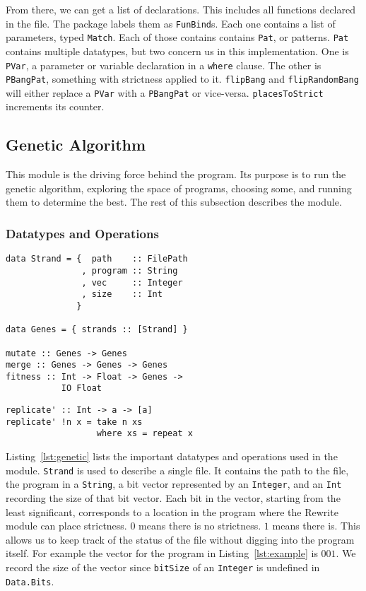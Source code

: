 \documentclass{sigplanconf}
\begin{document}
From there, we can get a list of declarations. This includes all functions declared in the file. The package labels them as \lstinline!FunBind!s. Each one contains a list of parameters, typed \lstinline!Match!. Each of those contains contains \lstinline!Pat!, or patterns. \lstinline!Pat! contains multiple datatypes, but two concern us in this implementation. One is \lstinline!PVar!, a parameter or variable declaration in a \lstinline!where! clause. The other is \lstinline!PBangPat!, something with strictness applied to it. \lstinline!flipBang! and \lstinline!flipRandomBang! will either replace a \lstinline!PVar! with a \lstinline!PBangPat! or vice-versa. \lstinline!placesToStrict! increments its counter.

\subsection{Genetic Algorithm}
This module is the driving force behind the program. Its purpose is to run the genetic algorithm, exploring the space of programs, choosing some, and running them to determine the best. The rest of this subsection describes the module.
\subsubsection{Datatypes and Operations}
\begin{lstlisting}[float,caption=Datatypes and operations in Genetic module,label={lst:genetic},frame=single]
data Strand = {  path    :: FilePath
               , program :: String
               , vec     :: Integer
               , size    :: Int
              }

data Genes = { strands :: [Strand] }

mutate :: Genes -> Genes
merge :: Genes -> Genes -> Genes
fitness :: Int -> Float -> Genes -> 
           IO Float
\end{lstlisting}
\begin{lstlisting}[float,caption=Example program,label={lst:example},frame=single]
replicate' :: Int -> a -> [a]
replicate' !n x = take n xs
                  where xs = repeat x
\end{lstlisting}


Listing~\ref{lst:genetic} lists the important datatypes and operations used in the module. \lstinline!Strand! is used to describe a single file. It contains the path to the file, the program in a \lstinline!String!, a bit vector represented by an \lstinline!Integer!, and an \lstinline!Int! recording the size of that bit vector. Each bit in the vector, starting from the least significant, corresponds to a location in the program where the Rewrite module can place strictness. $0$ means there is no strictness. $1$ means there is. This allows us to keep track of the status of the file without digging into the program itself. For example the vector for the program in Listing~\ref{lst:example} is $001$. We record the size of the vector since \lstinline!bitSize! of an \lstinline!Integer! is undefined in \lstinline!Data.Bits!.
\end{document}
